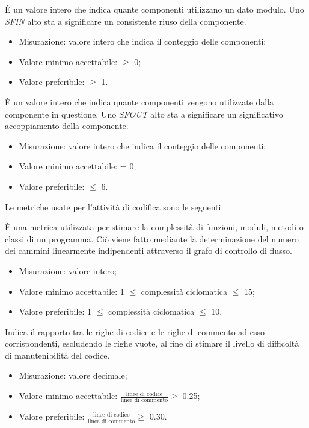 		
			È un valore intero che indica quante componenti utilizzano un dato modulo. Uno \textit{SFIN} alto sta a significare un consistente riuso della componente.
		\begin{itemize}
			\item{Misurazione: valore intero che indica il conteggio delle componenti;}
			\item{Valore minimo accettabile: $\geq$ 0;}
			\item{Valore preferibile: $\geq$ 1.}
		\end{itemize}
	
			È un valore intero che indica quante componenti vengono utilizzate dalla componente in questione. Uno \textit{SFOUT} alto sta a significare un significativo accoppiamento della componente.
		\begin{itemize}
			\item{Misurazione: valore intero che indica il conteggio delle componenti;}
			\item{Valore minimo accettabile: = 0;}
			\item{Valore preferibile: $\leq$ 6.}
		\end{itemize}
		
		Le metriche usate per l'attività di codifica sono le seguenti:
					
		È una metrica utilizzata per stimare la complessità di funzioni, moduli, metodi o classi di un programma. Ciò viene fatto mediante la determinazione del numero dei cammini linearmente indipendenti attraverso il grafo di controllo di flusso.
		\begin{itemize}
			\item{Misurazione: valore intero;}
			\item{Valore minimo accettabile: 1 $\leq$ complessità ciclomatica $\leq$ 15;}
			\item{Valore preferibile: 1 $\leq$ complessità ciclomatica $\leq$ 10.}
		\end{itemize}
			
		Indica il rapporto tra le righe di codice e le righe di commento ad esso corrispondenti, escludendo le righe vuote, al fine di stimare il livello di difficoltà di manutenibilità del codice. 	
		\begin{itemize}
			\item{Misurazione: valore decimale;}
			\item{Valore minimo accettabile: $\displaystyle\frac{\mbox{linee di codice}}{\mbox{linee di commento}} \geq$ 0.25;}
			\item{Valore preferibile: $\displaystyle\frac{\mbox{linee di codice}}{\mbox{linee di commento}} \geq$ 0.30.}
		\end{itemize}

